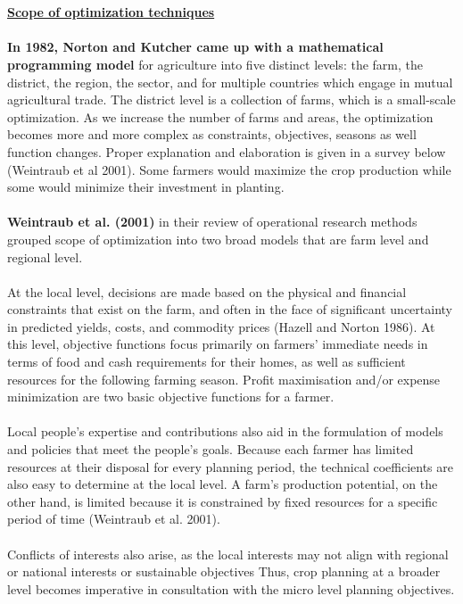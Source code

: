 \documentclass[conference]{IEEEtran}
\begin{document}
\\\\
\textbf{\underline{Scope of optimization techniques}}
\\\\
\textbf{In 1982, Norton and Kutcher came up with a mathematical programming model} for agriculture into five distinct levels: the farm, the district, the region, the sector, and for multiple countries which engage in mutual agricultural trade. The district level is a collection of farms, which is a small-scale optimization. As we increase the number of farms and areas, the optimization becomes more and more complex as constraints, objectives, seasons as well function changes. Proper explanation and elaboration is given in a survey below (Weintraub et al 2001). Some farmers would maximize the crop production while some would minimize their investment in planting. 
\\\\
\textbf{Weintraub et al. (2001)} in their review of operational research methods grouped scope of optimization into two broad models that are farm level and regional level.
\\\\
At the local level, decisions are made based on the physical and financial constraints that exist on the farm, and often in the face of significant uncertainty in predicted yields, costs, and commodity prices (Hazell and Norton 1986). At this level, objective functions focus primarily on farmers' immediate needs in terms of food and cash requirements for their homes, as well as sufficient resources for the following farming season. Profit maximisation and/or expense minimization are two basic objective functions for a farmer.
\\\\
Local people's expertise and contributions also aid in the formulation of models and policies that meet the people's goals. Because each farmer has limited resources at their disposal for every planning period, the technical coefficients are also easy to determine at the local level. A farm's production potential, on the other hand, is limited because it is constrained by fixed resources for a specific period of time (Weintraub et al. 2001).
\\\\
Conflicts of interests also arise, as the local interests may not align with regional or national interests or sustainable objectives Thus, crop planning at a broader level becomes imperative in consultation with the micro level planning objectives.
\end{document}
